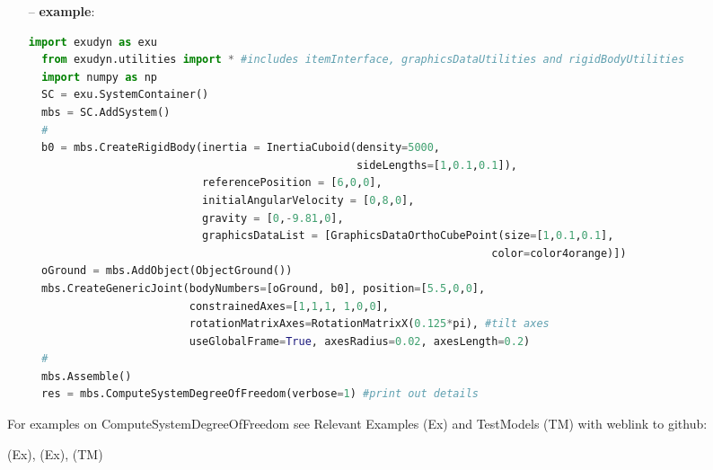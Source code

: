 \begin{itemize}[leftmargin=0.7cm]
{\bf notes}: this approach may not always work! Currently only works with dense matrices, thus it will be slow for larger systems
\item[--]
{\bf example}: \vspace{-12pt}\ei\begin{lstlisting}[language=Python, xleftmargin=36pt]
  import exudyn as exu
  from exudyn.utilities import * #includes itemInterface, graphicsDataUtilities and rigidBodyUtilities
  import numpy as np
  SC = exu.SystemContainer()
  mbs = SC.AddSystem()
  #
  b0 = mbs.CreateRigidBody(inertia = InertiaCuboid(density=5000,
                                                   sideLengths=[1,0.1,0.1]),
                           referencePosition = [6,0,0],
                           initialAngularVelocity = [0,8,0],
                           gravity = [0,-9.81,0],
                           graphicsDataList = [GraphicsDataOrthoCubePoint(size=[1,0.1,0.1],
                                                                        color=color4orange)])
  oGround = mbs.AddObject(ObjectGround())
  mbs.CreateGenericJoint(bodyNumbers=[oGround, b0], position=[5.5,0,0],
                         constrainedAxes=[1,1,1, 1,0,0],
                         rotationMatrixAxes=RotationMatrixX(0.125*pi), #tilt axes
                         useGlobalFrame=True, axesRadius=0.02, axesLength=0.2)
  #
  mbs.Assemble()
  res = mbs.ComputeSystemDegreeOfFreedom(verbose=1) #print out details
\end{lstlisting}\vspace{-24pt}\bi\item[]\vspace{-24pt}\vspace{12pt}\end{itemize}
%

%
\noindent For examples on ComputeSystemDegreeOfFreedom see Relevant Examples (Ex) and TestModels (TM) with weblink to github:
\bi
 \item \footnotesize {} (Ex), 
 (Ex), 
 (TM)
\ei

